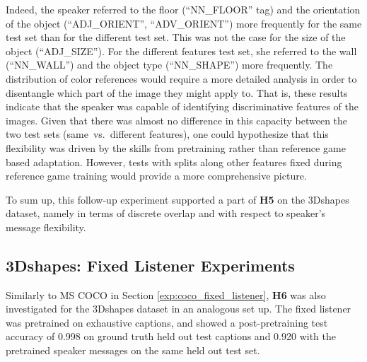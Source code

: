 Indeed, the speaker referred to the floor (``NN\_FLOOR'' tag) and the orientation of the object (``ADJ\_ORIENT'', ``ADV\_ORIENT'') more frequently for the same test set than for the different test set. This was not the case for the size of the object (``ADJ\_SIZE''). For the different features test set, she referred to the wall (``NN\_WALL'') and the object type (``NN\_SHAPE'') more frequently. 
The distribution of color references would require a more detailed analysis in order to disentangle which part of the image they might apply to. That is, these results indicate that the speaker was capable of identifying discriminative features of the images. Given that there was almost no difference in this capacity between the two test sets (same~vs.~different features), one could hypothesize that this flexibility was driven by the skills from pretraining rather than reference game based adaptation. However, tests with splits along other features fixed during reference game training would provide a more comprehensive picture.

To sum up, this follow-up experiment supported a part of \textbf{H5} on the 3Dshapes dataset, namely in terms of discrete overlap and with respect to speaker's message flexibility.


\subsection{3Dshapes: Fixed Listener Experiments}
\label{expt:3dshapes_fixed}

Similarly to MS COCO in Section \ref{exp:coco_fixed_listener}, \textbf{H6} was also investigated for the 3Dshapes dataset in an analogous set up. The fixed listener was pretrained on exhaustive captions, and showed a post-pretraining test accuracy of 0.998 on ground truth held out test captions and 0.920 with the pretrained speaker messages on the same held out test set. 


